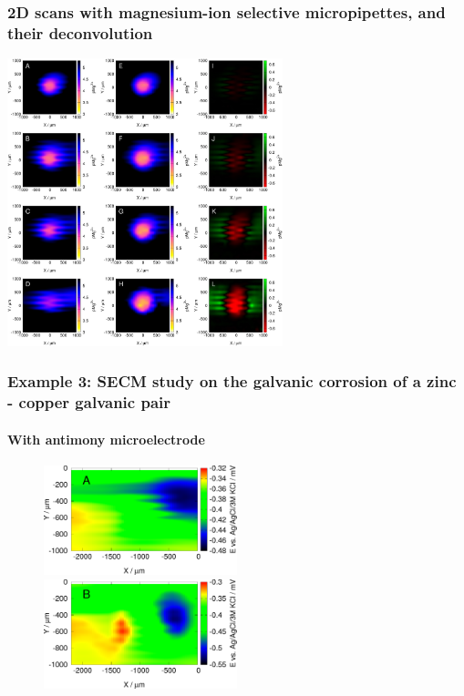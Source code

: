 \documentclass{beamer}
\begin{document}
\begin{frame}
\begin{center}
\frametitle{2D scans with magnesium-ion selective micropipettes, and their deconvolution}
\includegraphics[width=0.6\textwidth]{mg_2d.pdf}
\end{center}
\end{frame}


\begin{frame}
	\frametitle{Example 3: SECM study on the galvanic corrosion of a zinc - copper galvanic pair}
	\framesubtitle{With antimony microelectrode}
\begin{figure}
\centering
\includegraphics[width=0.5\textwidth]{1.pdf}

\includegraphics[width=0.5\textwidth]{1_deconvoluted.pdf}

\end{figure}
\end{frame}
\end{document}
